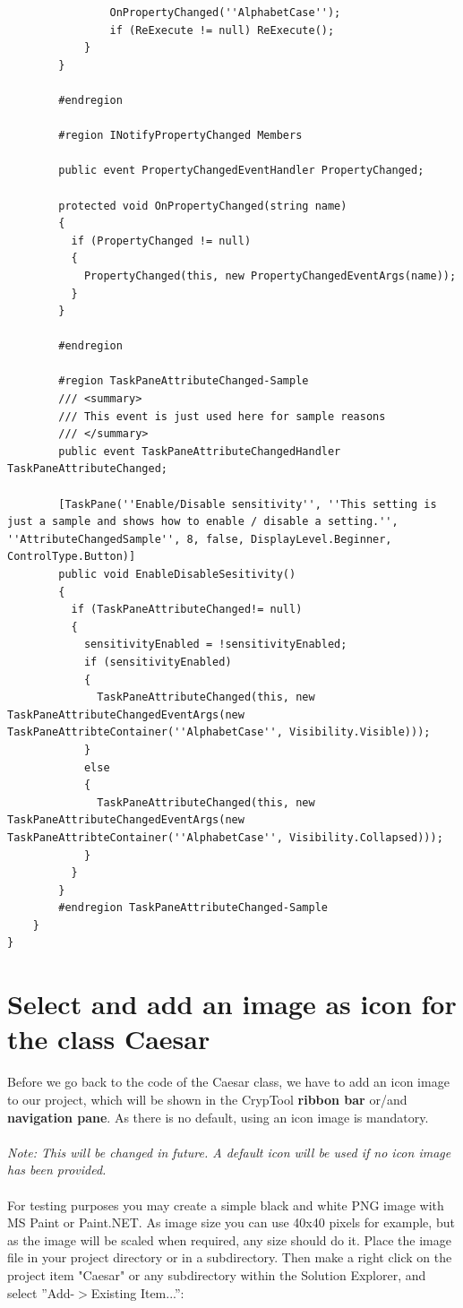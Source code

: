 \begin{lstlisting}
                OnPropertyChanged(''AlphabetCase'');
                if (ReExecute != null) ReExecute();
            }
        }

        #endregion

        #region INotifyPropertyChanged Members

        public event PropertyChangedEventHandler PropertyChanged;

        protected void OnPropertyChanged(string name)
        {
          if (PropertyChanged != null)
          {
            PropertyChanged(this, new PropertyChangedEventArgs(name));
          }
        }

        #endregion

        #region TaskPaneAttributeChanged-Sample
        /// <summary>
        /// This event is just used here for sample reasons
        /// </summary>
        public event TaskPaneAttributeChangedHandler TaskPaneAttributeChanged;

        [TaskPane(''Enable/Disable sensitivity'', ''This setting is just a sample and shows how to enable / disable a setting.'', ''AttributeChangedSample'', 8, false, DisplayLevel.Beginner, ControlType.Button)]
        public void EnableDisableSesitivity()
        {
          if (TaskPaneAttributeChanged!= null)
          {
            sensitivityEnabled = !sensitivityEnabled;
            if (sensitivityEnabled)
            {
              TaskPaneAttributeChanged(this, new TaskPaneAttributeChangedEventArgs(new TaskPaneAttribteContainer(''AlphabetCase'', Visibility.Visible)));
            }
            else
            {
              TaskPaneAttributeChanged(this, new TaskPaneAttributeChangedEventArgs(new TaskPaneAttribteContainer(''AlphabetCase'', Visibility.Collapsed)));
            }
          }
        }
        #endregion TaskPaneAttributeChanged-Sample
    }
}
\end{lstlisting}
\section{Select and add an image as icon for the class Caesar}\label{sec:SelectAndAddAnImageAsIconForTheClassCaesar}
Before we go back to the code of the Caesar class, we have to add an icon image to our project, which will be shown in the CrypTool \textbf{ribbon bar} or/and \textbf{navigation pane}. As there is no default, using an icon image is mandatory.\\\\
\textit{\small Note: This will be changed in future. A default icon will be used if no icon image has been provided.}\\\\
For testing purposes you may create a simple black and white PNG image with MS Paint or Paint.NET. As image size you can use 40x40 pixels for example, but as the image will be scaled when required, any size should do it. Place the image file in your project directory or in a subdirectory.\clearpage
Then make a right click on the project item "Caesar" or any subdirectory within the Solution Explorer, and select ''Add-$>$Existing Item...'':

